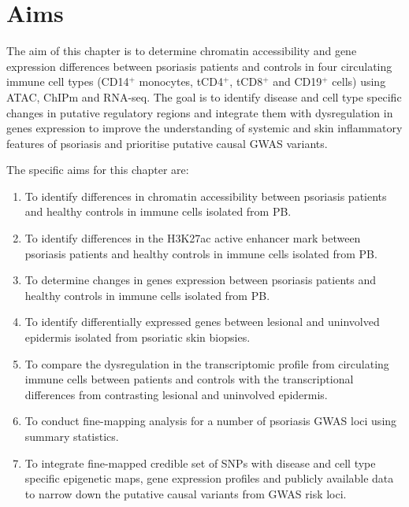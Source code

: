 


\section{Aims}
The aim of this chapter is to determine chromatin accessibility and gene expression differences between psoriasis patients and controls in four circulating immune cell types (CD14$^+$ monocytes, tCD4$^+$, tCD8$^+$ and CD19$^+$ cells) using ATAC, ChIPm and RNA-seq. The goal is to identify disease and cell type specific changes in putative regulatory regions and integrate them with dysregulation in genes expression to improve the understanding of systemic and skin inflammatory features of psoriasis and prioritise putative causal GWAS variants.

The specific aims for this chapter are:

\begin{enumerate}
\item To identify differences in chromatin accessibility between psoriasis patients and healthy controls in immune cells isolated from PB.
\item To identify differences in the H3K27ac active enhancer mark between psoriasis patients and healthy controls in immune cells isolated from PB.
\item To determine changes in genes expression between psoriasis patients and healthy controls in immune cells isolated from PB.
\item To identify differentially expressed genes between lesional and uninvolved epidermis isolated from psoriatic skin biopsies. 
\item To compare the dysregulation in the transcriptomic profile from circulating immune cells between patients and controls with the transcriptional differences from contrasting lesional and uninvolved epidermis.  
\item To conduct fine-mapping analysis for a number of psoriasis GWAS loci using summary statistics.
\item To integrate fine-mapped credible set of SNPs with disease and cell type specific epigenetic maps, gene expression profiles and publicly available data to narrow down the putative causal variants from GWAS risk loci.
\end{enumerate}

